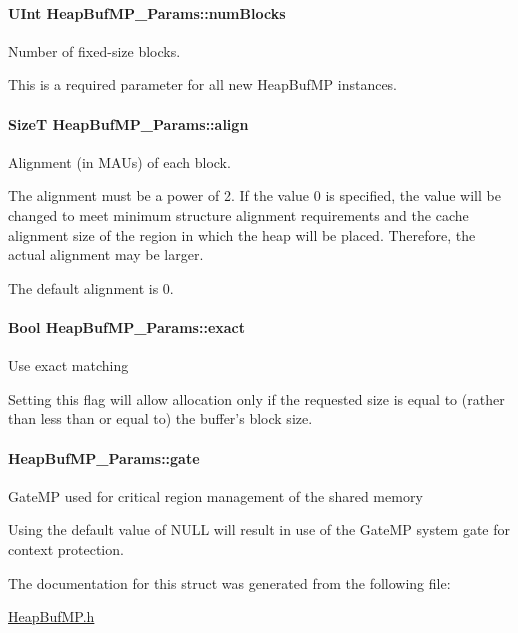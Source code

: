 \paragraph[{num\-Blocks}]{\setlength{\rightskip}{0pt plus 5cm}U\-Int Heap\-Buf\-M\-P\-\_\-\-Params\-::num\-Blocks}\label{struct_heap_buf_m_p___params_a4e85da751892052ed1fddc3376f64d9d}
Number of fixed-\/size blocks. \begin{DoxyVerb}    This is a required parameter for all new HeapBufMP instances.\end{DoxyVerb}
\paragraph[{align}]{\setlength{\rightskip}{0pt plus 5cm}Size\-T Heap\-Buf\-M\-P\-\_\-\-Params\-::align}\label{struct_heap_buf_m_p___params_a0b16778e64598aca34ee44c746374203}
Alignment (in M\-A\-Us) of each block. \begin{DoxyVerb}   The alignment must be a power of 2. If the value 0 is specified,
   the value will be changed to meet minimum structure alignment 
   requirements and the cache alignment size of the region in which the
   heap will be placed.  Therefore, the actual alignment may be larger.

   The default alignment is 0.\end{DoxyVerb}
\paragraph[{exact}]{\setlength{\rightskip}{0pt plus 5cm}Bool Heap\-Buf\-M\-P\-\_\-\-Params\-::exact}\label{struct_heap_buf_m_p___params_a1ebbb52b6985282c23f534da4ac27eaa}
Use exact matching \begin{DoxyVerb}   Setting this flag will allow allocation only if the requested size
   is equal to (rather than less than or equal to) the buffer's block
   size.\end{DoxyVerb}
\paragraph[{gate}]{ Heap\-Buf\-M\-P\-\_\-\-Params\-::gate}\label{struct_heap_buf_m_p___params_a3b1ef95defb6c91953bd53050489644e}
Gate\-M\-P used for critical region management of the shared memory \begin{DoxyVerb}   Using the default value of NULL will result in use of the GateMP
   system gate for context protection.\end{DoxyVerb}
 

The documentation for this struct was generated from the following file\-:\begin{DoxyCompactItemize}
\item 
\hyperlink{_heap_buf_m_p_8h}{Heap\-Buf\-M\-P.\-h}\end{DoxyCompactItemize}

